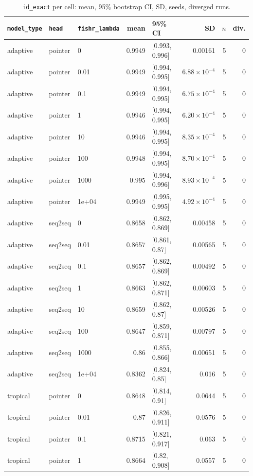 \documentclass[10pt]{article}
\begin{document}
{\small
\begin{longtable}{lllrlrrr}
\caption{\texttt{id\_exact} per cell: mean, 95\% bootstrap CI, SD, seeds, diverged runs.}\label{tab:summary-id_exact}\\
\toprule
\texttt{model\_type} & \texttt{head} & \texttt{fishr\_lambda} & mean & 95\% CI & SD & $n$ & div.\\
\midrule
\endhead
adaptive & pointer & 0 & 0.9949 & [0.993, 0.996] & 0.00161 & 5 & 0\\
adaptive & pointer & 0.01 & 0.9949 & [0.994, 0.995] & $6.88\times10^{-4}$ & 5 & 0\\
adaptive & pointer & 0.1 & 0.9949 & [0.994, 0.995] & $6.75\times10^{-4}$ & 5 & 0\\
adaptive & pointer & 1 & 0.9946 & [0.994, 0.995] & $6.20\times10^{-4}$ & 5 & 0\\
adaptive & pointer & 10 & 0.9946 & [0.994, 0.995] & $8.35\times10^{-4}$ & 5 & 0\\
adaptive & pointer & 100 & 0.9948 & [0.994, 0.995] & $8.70\times10^{-4}$ & 5 & 0\\
adaptive & pointer & 1000 & 0.995 & [0.994, 0.996] & $8.93\times10^{-4}$ & 5 & 0\\
adaptive & pointer & 1e+04 & 0.9949 & [0.995, 0.995] & $4.92\times10^{-4}$ & 5 & 0\\
adaptive & seq2seq & 0 & 0.8658 & [0.862, 0.869] & 0.00458 & 5 & 0\\
adaptive & seq2seq & 0.01 & 0.8657 & [0.861, 0.87] & 0.00565 & 5 & 0\\
adaptive & seq2seq & 0.1 & 0.8657 & [0.862, 0.869] & 0.00492 & 5 & 0\\
adaptive & seq2seq & 1 & 0.8663 & [0.862, 0.871] & 0.00603 & 5 & 0\\
adaptive & seq2seq & 10 & 0.8659 & [0.862, 0.87] & 0.00526 & 5 & 0\\
adaptive & seq2seq & 100 & 0.8647 & [0.859, 0.871] & 0.00797 & 5 & 0\\
adaptive & seq2seq & 1000 & 0.86 & [0.855, 0.866] & 0.00651 & 5 & 0\\
adaptive & seq2seq & 1e+04 & 0.8362 & [0.824, 0.85] & 0.016 & 5 & 0\\
tropical & pointer & 0 & 0.8648 & [0.814, 0.91] & 0.0644 & 5 & 0\\
tropical & pointer & 0.01 & 0.87 & [0.826, 0.911] & 0.0576 & 5 & 0\\
tropical & pointer & 0.1 & 0.8715 & [0.821, 0.917] & 0.063 & 5 & 0\\
tropical & pointer & 1 & 0.8664 & [0.82, 0.908] & 0.0557 & 5 & 0\\

\end{longtable}}
\end{document}
